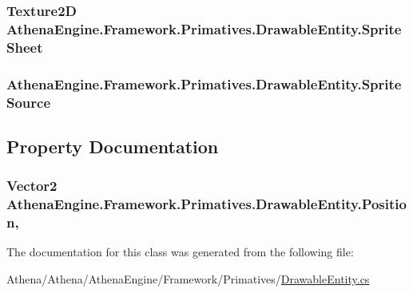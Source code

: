 \hypertarget{class_athena_engine_1_1_framework_1_1_primatives_1_1_drawable_entity_a667a51ee645b86389795eb0e132f9534}{
\subsubsection[{Sprite\-Sheet}]{\setlength{\rightskip}{0pt plus 5cm}Texture2\-D Athena\-Engine.\-Framework.\-Primatives.\-Drawable\-Entity.\-Sprite\-Sheet\hspace{0.3cm}{\ttfamily [protected]}}}\label{class_athena_engine_1_1_framework_1_1_primatives_1_1_drawable_entity_a667a51ee645b86389795eb0e132f9534}
\hypertarget{class_athena_engine_1_1_framework_1_1_primatives_1_1_drawable_entity_a27c0d8c1dd1000a454cff027372edb64}{
\subsubsection[{Sprite\-Source}]{ Athena\-Engine.\-Framework.\-Primatives.\-Drawable\-Entity.\-Sprite\-Source\hspace{0.3cm}{\ttfamily [protected]}}}\label{class_athena_engine_1_1_framework_1_1_primatives_1_1_drawable_entity_a27c0d8c1dd1000a454cff027372edb64}


\subsection{Property Documentation}
\hypertarget{class_athena_engine_1_1_framework_1_1_primatives_1_1_drawable_entity_ae4b9539a2dd0df69e0230a9d5e31c133}{
\subsubsection[{Position}]{\setlength{\rightskip}{0pt plus 5cm}Vector2 Athena\-Engine.\-Framework.\-Primatives.\-Drawable\-Entity.\-Position\hspace{0.3cm}{\ttfamily [get]}, {\ttfamily [set]}}}\label{class_athena_engine_1_1_framework_1_1_primatives_1_1_drawable_entity_ae4b9539a2dd0df69e0230a9d5e31c133}


The documentation for this class was generated from the following file\-:\begin{DoxyCompactItemize}
\item 
Athena/\-Athena/\-Athena\-Engine/\-Framework/\-Primatives/\hyperlink{_drawable_entity_8cs}{Drawable\-Entity.\-cs}\end{DoxyCompactItemize}
